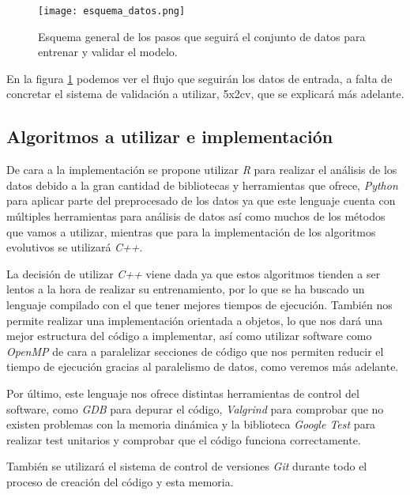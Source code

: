 \begin{figure}[H]
    \centering
	  \texttt{[image: esquema\_datos.png]}
    \caption{Esquema general de los pasos que seguirá el conjunto de datos para entrenar y validar el modelo.}
	 \label{fig:esquema_datos}
\end{figure}

En la figura \ref{fig:esquema_datos} podemos ver el flujo que seguirán los datos de entrada, a falta de concretar el sistema de validación a utilizar, 5x2cv, que se explicará más adelante.

\newpage

\subsection{Algoritmos a utilizar e implementación}

De cara a la implementación se propone utilizar \textit{R} para realizar el análisis de los datos debido a la gran cantidad de bibliotecas y herramientas que ofrece, \textit{Python} para aplicar parte del preprocesado de los datos ya que este lenguaje cuenta con múltiples herramientas para análisis de datos así como muchos de los métodos que vamos a utilizar, mientras que para la implementación de los algoritmos evolutivos se utilizará \textit{C++}.

La decisión de utilizar \textit{C++} viene dada ya que estos algoritmos tienden a ser lentos a la hora de realizar su entrenamiento, por lo que se ha buscado un lenguaje compilado con el que tener mejores tiempos de ejecución. También nos permite realizar una implementación orientada a objetos, lo que nos dará una mejor estructura del código a implementar, así como utilizar software como \textit{OpenMP} \cite{OpenMP} de cara a paralelizar secciones de código que nos permiten reducir el tiempo de ejecución gracias al paralelismo de datos, como veremos más adelante.

Por último, este lenguaje nos ofrece distintas herramientas de control del software, como \textit{GDB} \cite{gdb} para depurar el código, \textit{Valgrind} \cite{valgrind} para comprobar que no existen problemas con la memoria dinámica y la biblioteca \textit{Google Test} \cite{gtest} para realizar test unitarios y comprobar que el código funciona correctamente.

También se utilizará el sistema de control de versiones \textit{Git} \cite{git} durante todo el proceso de creación del código y esta memoria.



\newpage

